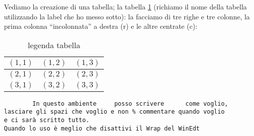 \subsubsection{}
Vediamo la creazione di una tabella; la tabella \ref{tab:uno}
(richiamo il nome della tabella utilizzando la label che ho messo sotto):
la facciamo di tre righe e tre colonne, la prima colonna
``incolonnata'' a destra (r) e le altre centrate (c):\\
\begin{table}[h]                        %
\begin{center}                          %
\begin{tabular}{r|c|c}                  %
\hline \hline                           %
$(1,1)$ & $(1,2)$ & $(1,3)$\\           %
\hline                                  %
$(2,1)$ & $(2,2)$ & $(2,3)$\\           %
\hline                                  %
$(3,1)$ & $(3,2)$ & $(3,3)$\\
\hline \hline                           %
\end{tabular}
\caption[legenda elenco tabelle]{legenda tabella}\label{tab:uno}
\end{center}
\end{table}
\begin{verbatim}
        In questo ambiente     posso scrivere      come voglio,
lasciare gli spazi che voglio e non % commentare quando voglio
e ci sarà scritto tutto.
Quando lo uso è meglio che disattivi il Wrap del WinEdt
\end{verbatim}